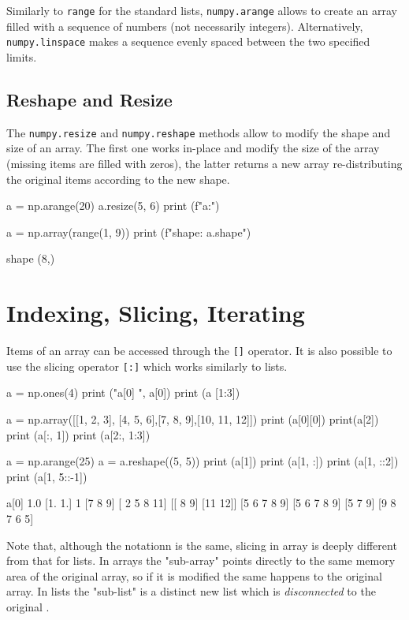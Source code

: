 Similarly to \texttt{range} for the standard lists, \texttt{numpy.arange} allows to create an array filled with a sequence of numbers (not necessarily integers). Alternatively, \texttt{numpy.linspace} makes a sequence evenly spaced between the two specified limits.

\subsection{Reshape and Resize}

The \texttt{numpy.resize} and \texttt{numpy.reshape} methods allow to modify the shape and size of an array. 
The first one works in-place and modify the size of the array (missing items are filled with zeros), the latter returns a new array re-distributing the original items according to the new shape.

\begin{ipythonnon}
a = np.arange(20)
a.resize(5, 6)
print (f"a:")

a = np.array(range(1, 9))
print (f"shape: {a.shape}")
\end{ipythonnon}
\begin{ioutput}
shape (8,)
\end{ioutput}

\section{Indexing, Slicing, Iterating}

Items of an array can be accessed through the \texttt{[]} operator. It is also possible to use the slicing operator \texttt{[:]} which works similarly to lists.

\begin{ipythonnon}
a = np.ones(4)
print ("a[0] ", a[0])
print (a [1:3])

a = np.array([[1, 2, 3], [4, 5, 6],[7, 8, 9],[10, 11, 12]])
print (a[0][0])
print(a[2])
print (a[:, 1])
print (a[2:, 1:3])

a = np.arange(25)
a = a.reshape((5, 5))
print (a[1])
print (a[1, :])
print (a[1, ::2])
print (a[1, 5::-1])
\end{ipythonnon}
\begin{ioutput}
a[0]  1.0
[1. 1.]
1
[7 8 9]
[ 2  5  8 11]
[[ 8  9]
 [11 12]]
[5 6 7 8 9]
[5 6 7 8 9]
[5 7 9]
[9 8 7 6 5]
\end{ioutput}

Note that, although the notationn is the same, slicing in array is deeply different from that for lists.
In arrays the "sub-array" points directly to the same memory area of the original array, so if it is modified the same happens to the original array. In lists the "sub-list" is a distinct new list which is \emph{disconnected} to the original .

